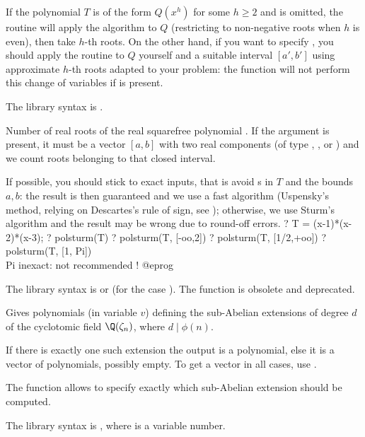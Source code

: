  If the polynomial $T$ is of the
form $Q(x^h)$ for some $h\geq 2$ and  is omitted, the routine will
apply the algorithm to $Q$ (restricting to non-negative roots when $h$ is
even), then take $h$-th roots. On the other hand, if you want to specify
, you should apply the routine to $Q$ yourself and a suitable
interval $[a',b']$ using approximate $h$-th roots adapted to your problem:
the function will not perform this change of variables if  is present.

The library syntax is .

\label{se:polsturm}
Number of real roots of the real squarefree polynomial . If
the argument  is present, it must be a vector $[a,b]$ with
two real components (of type , , 
or  ) and we count roots belonging to that closed interval.

If possible, you should stick to exact inputs, that is avoid s in
$T$ and the bounds $a,b$: the result is then guaranteed and we use a fast
algorithm (Uspensky's method, relying on Descartes's rule of sign, see
); otherwise, we use Sturm's algorithm and the result
may be wrong due to round-off errors.
\bprog
? T = (x-1)*(x-2)*(x-3);
? polsturm(T)
? polsturm(T, [-oo,2])
? polsturm(T, [1/2,+oo])
? polsturm(T, [1, Pi])  \\ Pi inexact: not recommended !
@eprog

The library syntax is  or
 (for the case ). The function
 is obsolete and deprecated.

\label{se:polsubcyclo}
Gives polynomials (in variable $v$) defining the sub-Abelian extensions
of degree $d$ of the cyclotomic field $\Q(\zeta_n)$, where $d\mid \phi(n)$.

If there is exactly one such extension the output is a polynomial, else it is
a vector of polynomials, possibly empty. To get a vector in all cases,
use .

The function  allows to specify exactly which
sub-Abelian extension should be computed.

The library syntax is , where  is a variable number.

